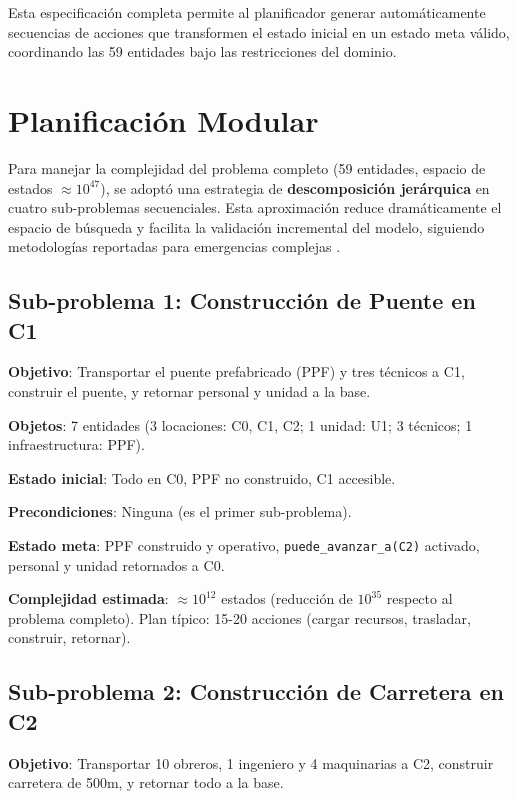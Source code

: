 \documentclass[conference]{IEEEtran}
\begin{document}
    Esta especificación completa permite al planificador generar automáticamente secuencias de acciones que transformen el estado inicial en un estado meta válido, coordinando las 59 entidades bajo las restricciones del dominio.

    \section{Planificación Modular}

    Para manejar la complejidad del problema completo (59 entidades, espacio de estados $\approx 10^{47}$), se adoptó una estrategia de \textbf{descomposición jerárquica} en cuatro sub-problemas secuenciales. Esta aproximación reduce dramáticamente el espacio de búsqueda y facilita la validación incremental del modelo, siguiendo metodologías reportadas para emergencias complejas \cite{liu2016htn}.

    \subsection{Sub-problema 1: Construcción de Puente en C1}

    \textbf{Objetivo}: Transportar el puente prefabricado (PPF) y tres técnicos a C1, construir el puente, y retornar personal y unidad a la base.

    \textbf{Objetos}: 7 entidades (3 locaciones: C0, C1, C2; 1 unidad: U1; 3 técnicos; 1 infraestructura: PPF).

    \textbf{Estado inicial}: Todo en C0, PPF no construido, C1 accesible.

    \textbf{Precondiciones}: Ninguna (es el primer sub-problema).

    \textbf{Estado meta}: PPF construido y operativo, \texttt{puede\_avanzar\_a(C2)} activado, personal y unidad retornados a C0.

    \textbf{Complejidad estimada}: $\approx 10^{12}$ estados (reducción de $10^{35}$ respecto al problema completo). Plan típico: 15-20 acciones (cargar recursos, trasladar, construir, retornar).

    \subsection{Sub-problema 2: Construcción de Carretera en C2}

    \textbf{Objetivo}: Transportar 10 obreros, 1 ingeniero y 4 maquinarias a C2, construir carretera de 500m, y retornar todo a la base.
\end{document}
